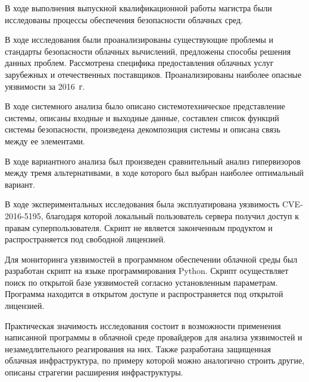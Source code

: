 
В ходе выполнения выпускной квалификационной работы магистра были исследованы процессы обеспечения безопасности облачных сред.

В ходе исследования были проанализированы существующие проблемы и стандарты безопасности облачных вычислений, предложены способы решения данных проблем.
Рассмотрена специфика предоставления облачных услуг зарубежных и отечественных поставщиков.
Проанализированы наиболее опасные уязвимости за 2016~г.

В ходе системного анализа было описано системотехническое представление системы, описаны входные и выходные данные, составлен список функций системы безопасности, произведена декомпозиция системы и описана связь между ее элементами.

В ходе вариантного анализа был произведен сравнительный анализ гипервизоров между тремя альтернативами, в ходе которого был выбран наиболее оптимальный вариант.

В ходе экспериментальных исследования была эксплуатирована уязвимость CVE-2016-5195, благодаря которой локальный пользователь сервера получил доступ к правам суперпользователя.
Скрипт не является законченным продуктом и распространяется под свободной лицензией.

Для мониторинга уязвимостей в программном обеспечении облачной среды был разработан скрипт на языке программирования Python.
Скрипт осуществляет поиск по открытой базе уязвимостей согласно установленным параметрам.
Программа находится в открытом доступе и распространяется под открытой лицензией.

Практическая значимость исследования состоит в возможности применения написанной программы в облачной среде провайдеров для анализа уязвимостей и незамедлительного реагирования на них.
Также разработана защищенная облачная инфраструктура, по примеру которой можно аналогично строить другие, описаны страгегии расширения инфраструктуры.

\clearpage
